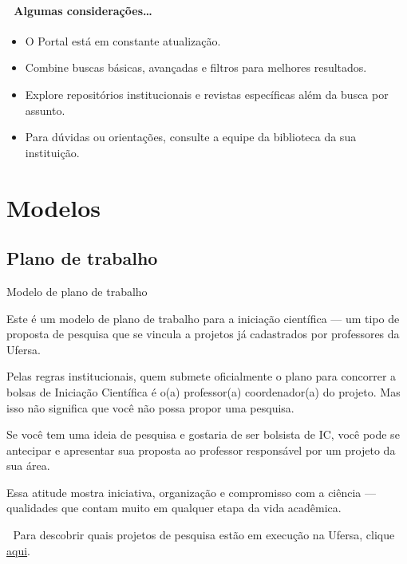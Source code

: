 \documentclass[
  letterpaper,
  DIV=11,
  numbers=noendperiod]{scrreprt}
\providecommand{\tightlist}{%
  \setlength{\itemsep}{0pt}\setlength{\parskip}{0pt}}
\begin{document}
\subsection{📌 Algumas
considerações\ldots{}}\label{algumas-considerauxe7uxf5es-1}

\begin{itemize}
\tightlist
\item
  O Portal está em constante atualização.
\item
  Combine buscas básicas, avançadas e filtros para melhores resultados.
\item
  Explore repositórios institucionais e revistas específicas além da
  busca por assunto.
\item
  Para dúvidas ou orientações, consulte a equipe da biblioteca da sua
  instituição.
\end{itemize}

\part{Modelos}

\chapter{Plano de trabalho}\label{plano-de-trabalho}

Modelo de plano de trabalho

\begin{tcolorbox}[enhanced jigsaw, opacityback=0, colback=white, breakable, opacitybacktitle=0.6, leftrule=.75mm, left=2mm, colframe=quarto-callout-tip-color-frame, colbacktitle=quarto-callout-tip-color!10!white, coltitle=black, arc=.35mm, toprule=.15mm, bottomtitle=1mm, toptitle=1mm, titlerule=0mm, title=\textcolor{quarto-callout-tip-color}{\faLightbulb}\hspace{0.5em}{Dica}, rightrule=.15mm, bottomrule=.15mm]

Este é um modelo de plano de trabalho para a iniciação científica --- um
tipo de proposta de pesquisa que se vincula a projetos já cadastrados
por professores da Ufersa.

Pelas regras institucionais, quem submete oficialmente o plano para
concorrer a bolsas de Iniciação Científica é o(a) professor(a)
coordenador(a) do projeto. Mas isso não significa que você não possa
propor uma pesquisa.

Se você tem uma ideia de pesquisa e gostaria de ser bolsista de IC, você
pode se antecipar e apresentar sua proposta ao professor responsável por
um projeto da sua área.

Essa atitude mostra iniciativa, organização e compromisso com a ciência
--- qualidades que contam muito em qualquer etapa da vida acadêmica.

🔎 Para descobrir quais projetos de pesquisa estão em execução na
Ufersa, clique
\href{https://sigaa.ufersa.edu.br/sigaa/public/pesquisa/consulta_projetos.jsf}{aqui}.

\end{tcolorbox}
\end{document}
